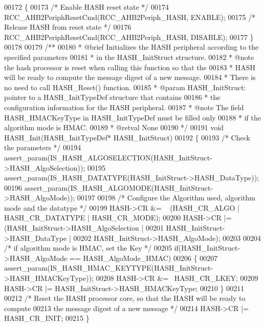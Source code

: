 \begin{DoxyCode}
00172 \{
00173   \textcolor{comment}{/* Enable HASH reset state */}
00174   RCC_AHB2PeriphResetCmd(RCC_AHB2Periph_HASH, ENABLE);
00175   \textcolor{comment}{/* Release HASH from reset state */}
00176   RCC_AHB2PeriphResetCmd(RCC_AHB2Periph_HASH, DISABLE);
00177 \}
00178 
00179 \textcolor{comment}{/**}
00180 \textcolor{comment}{  * @brief  Initializes the HASH peripheral according to the specified parameters}
00181 \textcolor{comment}{  *         in the HASH\_InitStruct structure.}
00182 \textcolor{comment}{  * @note   the hash processor is reset when calling this function so that the}
00183 \textcolor{comment}{  *         HASH will be ready to compute the message digest of a new message.}
00184 \textcolor{comment}{  *         There is no need to call HASH\_Reset() function.           }
00185 \textcolor{comment}{  * @param  HASH\_InitStruct: pointer to a HASH\_InitTypeDef structure that contains}
00186 \textcolor{comment}{  *         the configuration information for the HASH peripheral.}
00187 \textcolor{comment}{  * @note   The field HASH\_HMACKeyType in HASH\_InitTypeDef must be filled only }
00188 \textcolor{comment}{  *          if the algorithm mode is HMAC.       }
00189 \textcolor{comment}{  * @retval None}
00190 \textcolor{comment}{  */}
00191 \textcolor{keywordtype}{void} HASH_Init(HASH\_InitTypeDef* HASH\_InitStruct)
00192 \{
00193   \textcolor{comment}{/* Check the parameters */}
00194   assert_param(IS\_HASH\_ALGOSELECTION(HASH\_InitStruct->HASH\_AlgoSelection));
00195   assert_param(IS\_HASH\_DATATYPE(HASH\_InitStruct->HASH\_DataType));
00196   assert_param(IS\_HASH\_ALGOMODE(HASH\_InitStruct->HASH\_AlgoMode));
00197 
00198   \textcolor{comment}{/* Configure the Algorithm used, algorithm mode and the datatype */}
00199   HASH->CR &= ~ (HASH_CR_ALGO | HASH_CR_DATATYPE | HASH_CR_MODE);
00200   HASH->CR |= (HASH\_InitStruct->HASH\_AlgoSelection |
00201                HASH\_InitStruct->HASH\_DataType |
00202                HASH\_InitStruct->HASH\_AlgoMode);
00203 
00204   \textcolor{comment}{/* if algorithm mode is HMAC, set the Key */}
00205   \textcolor{keywordflow}{if}(HASH\_InitStruct->HASH_AlgoMode == HASH_AlgoMode_HMAC)
00206   \{
00207     assert_param(IS\_HASH\_HMAC\_KEYTYPE(HASH\_InitStruct->HASH\_HMACKeyType));
00208     HASH->CR &= ~HASH_CR_LKEY;
00209     HASH->CR |= HASH\_InitStruct->HASH\_HMACKeyType;
00210   \}
00211 
00212   \textcolor{comment}{/* Reset the HASH processor core, so that the HASH will be ready to compute }
00213 \textcolor{comment}{     the message digest of a new message */}
00214   HASH->CR |= HASH_CR_INIT;
00215 \}

\end{DoxyCode}
